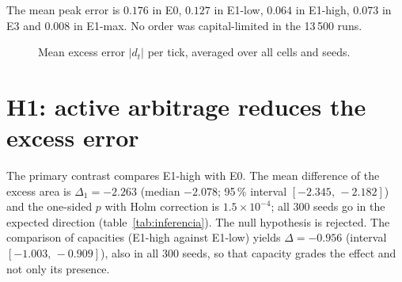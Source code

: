 The mean peak error is $0.176$ in E0, $0.127$ in E1-low, $0.064$ in E1-high, $0.073$ in E3 and $0.008$ in E1-max. No order was capital-limited in the 13\,500 runs.

\begin{figure}[htbp]
\centering
{}
\caption{Mean excess error $|d_t|$ per tick, averaged over all cells and seeds.}
\label{fig:trayectorias}
\end{figure}

\section{H1: active arbitrage reduces the excess error}
\label{sec:res-h1}

The primary contrast compares E1-high with E0. The mean difference of the excess area is $\Delta_1=-2.263$ (median $-2.078$; 95\,\% interval $[-2.345,\,-2.182]$) and the one-sided $p$ with Holm correction is $1.5\times10^{-4}$; all 300 seeds go in the expected direction (table~\ref{tab:inferencia}). The null hypothesis is rejected. The comparison of capacities (E1-high against E1-low) yields $\Delta=-0.956$ (interval $[-1.003,\,-0.909]$), also in all 300 seeds, so that capacity grades the effect and not only its presence.

